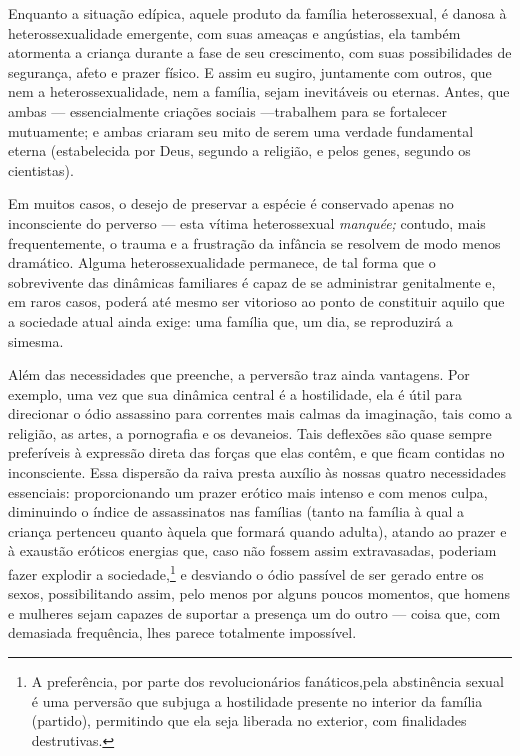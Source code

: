 Enquanto a situação edípica, aquele produto da família
heterossexual, é danosa à heterossexualidade emergente, com suas
ameaças e angústias, ela também atormenta a criança durante a fase de
seu crescimento, com suas possibilidades de segurança, afeto e prazer
físico. E assim eu sugiro, juntamente com outros, que nem a
heterossexualidade, nem a família, sejam inevitáveis ou eternas. Antes,
que ambas --- essencialmente criações sociais ---\idxconfe[|)] trabalhem para se
fortalecer mutuamente; e ambas criaram seu mito de serem uma verdade
fundamental eterna (estabelecida por Deus, segundo a religião, e pelos
genes, segundo os cientistas).

Em muitos casos, o desejo de preservar a espécie é conservado apenas
no inconsciente do perverso --- esta vítima heterossexual
\textit{manquée;} contudo, mais frequentemente, o trauma\idxtrauma{} e a frustração
da infância se resolvem de modo menos dramático. Alguma
heterossexualidade permanece, de tal forma que o sobrevivente das
dinâmicas familiares é capaz de se administrar genitalmente e, em raros
casos, poderá até mesmo ser vitorioso ao ponto de constituir aquilo que
a sociedade atual ainda exige: uma família que, um dia, se reproduzirá
a si\idxhetero[|)] mesma.\idxpervsobre[|)]

Além das necessidades que preenche, a perversão traz ainda
vantagens. Por exemplo, uma vez que sua dinâmica central é a
hostilidade,\idxhost{} ela é útil para direcionar o ódio assassino para correntes
mais calmas da imaginação, tais como a religião, as artes, a
pornografia\idxporno{} e os devaneios.\idxcria{} Tais deflexões são quase sempre preferíveis
à expressão direta das forças que elas contêm, e que ficam contidas no
inconsciente. Essa dispersão da raiva presta auxílio às nossas quatro
necessidades essenciais: proporcionando um prazer erótico mais intenso
e com menos culpa, diminuindo o índice de assassinatos nas famílias
(tanto na família à qual a criança pertenceu quanto àquela que formará
quando adulta), atando ao prazer e à exaustão eróticos energias que,
caso não fossem assim extravasadas, poderiam fazer explodir a sociedade,\footnote{ A preferência,
por parte dos revolucionários fanáticos,\idxsexulres[|nn] pela
abstinência sexual é uma perversão que subjuga a hostilidade presente
no interior da família (partido),\idxinflu{} permitindo que ela seja liberada no
exterior, com finalidades destrutivas.} e desviando o ódio passível de
ser gerado entre os sexos, possibilitando assim, pelo menos por alguns
poucos momentos, que homens e mulheres sejam capazes de suportar a
presença um do outro --- coisa que, com demasiada frequência, lhes
parece totalmente impossível.

